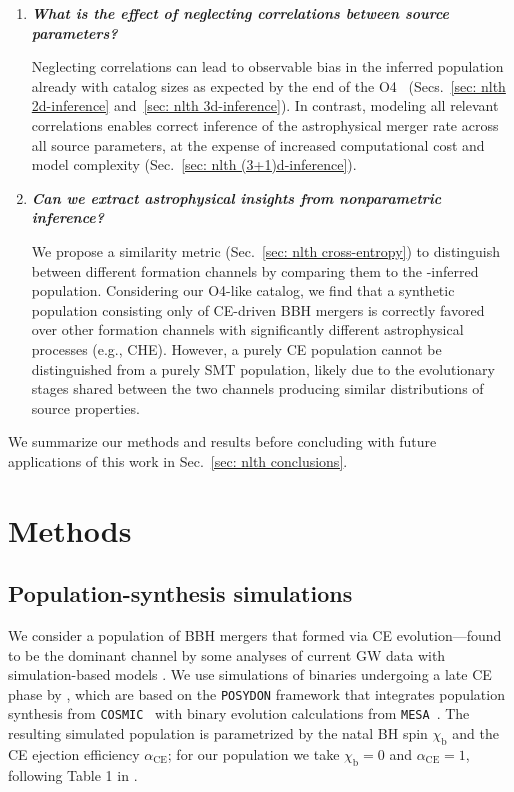 \begin{refsection}
\begin{enumerate}
\item \textit{\textbf{What is the effect of neglecting correlations between source parameters?
}}

Neglecting correlations can lead to observable bias in the inferred population already with catalog sizes as expected by the end of the \ac{O4}~\citep{Capote:2024rmo} (Secs.~\ref{sec: nlth 2d-inference} and~\ref{sec: nlth 3d-inference}).
In contrast, modeling all relevant correlations enables correct inference of the astrophysical merger rate across all source parameters, at the expense of increased computational cost and model complexity (Sec.~\ref{sec: nlth (3+1)d-inference}).

\item \textit{\textbf{Can we extract astrophysical insights from nonparametric inference?
}}

We propose a similarity metric
(Sec.~\ref{sec: nlth cross-entropy}) 
to distinguish between different formation channels by comparing them to the \PixelPop-inferred population.
Considering our \ac{O4}-like catalog, we find that a synthetic population consisting only of CE-driven BBH mergers is correctly favored over other formation channels with significantly different astrophysical processes (e.g., \ac{CHE}). However, a purely \ac{CE} population cannot be distinguished from a purely \ac{SMT} population,
likely due to the evolutionary stages shared between the two channels producing similar distributions of source properties.
\end{enumerate}

We summarize our methods and results before concluding with future applications of this work in Sec.~\ref{sec: nlth conclusions}.

\section{Methods}
\label{sec: nlth methods}

\subsection{Population-synthesis simulations}
\label{sec: nlth pop synth simulations}

We consider a population of \ac{BBH} mergers that formed via \ac{CE} evolution---found to be the dominant channel by some analyses of current GW data with simulation-based models \citep{Zevin:2020gbd, Cheng:2023ddt,Colloms:2025hib}. We use simulations of binaries undergoing a late \ac{CE} phase by \citet{Zevin:2020gbd}, which are based on the \texttt{POSYDON} framework \citep{Fragos:2022jik} that integrates population synthesis from \texttt{COSMIC}~\citep{Breivik:2019lmt} with binary evolution calculations from \texttt{MESA}~\citep{Paxton:2010ji,Paxton:2013pj,Paxton:2015jva,Paxton:2017eie,Paxton:2019lxx}. The resulting simulated population is parametrized by the natal BH spin $\chi_\mathrm{b}$ and the \ac{CE} ejection efficiency $\alpha_{\mathrm{CE}}$; for our population we take $\chi_\mathrm{b}=0$ and $\alpha_{\mathrm{CE}}=1$, following Table 1 in \citet{Cheng:2023ddt}.


\end{refsection}
